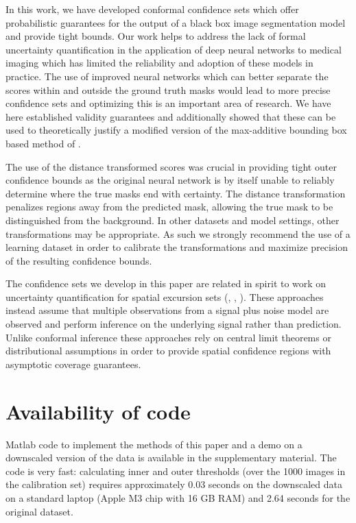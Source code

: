 In this work, we have developed conformal confidence sets which offer probabilistic guarantees for the output of a black box image segmentation model and provide tight bounds. Our work helps to address the lack of formal uncertainty quantification in the application of deep neural networks to medical imaging which has limited the reliability and adoption of these models in practice. The use of improved neural networks which can better separate the scores within and outside the ground truth masks would lead to more precise confidence sets and optimizing this is an important area of research. We have here established validity guarantees and additionally showed that these can be used to theoretically justify a modified version of the max-additive bounding box based method of \cite{Andeol2023}. 

The use of the distance transformed scores was crucial in providing tight outer confidence bounds as the original neural network is by itself unable to reliably determine where the true masks end with certainty.  The distance transformation penalizes regions away from the predicted mask, allowing the true mask to be distinguished from the background. In other datasets and model settings, other transformations may be appropriate. As such we strongly recommend the use of a learning dataset in order to calibrate the transformations and maximize precision of the resulting confidence bounds.

The confidence sets we develop in this paper are related in spirit to work on uncertainty quantification for spatial excursion sets (\cite{chen2017density}, \cite{Bowring2019}, \cite{Mejia2020}). These approaches instead assume that multiple observations from a signal plus noise model are observed and perform inference on the underlying signal rather than prediction. Unlike conformal inference these approaches rely on central limit theorems or distributional assumptions in order to provide spatial confidence regions with asymptotic coverage guarantees. 

\section*{Availability of code}
\vspace{-0.1cm}
Matlab code to implement the methods of this paper and a demo on a downscaled version of the data is available in the supplementary material. The code is very fast: calculating inner and outer thresholds (over the 1000 images in the calibration set) requires approximately 0.03 seconds on the downscaled data on a standard laptop (Apple M3 chip with 16 GB RAM) and 2.64 seconds for the original dataset. 